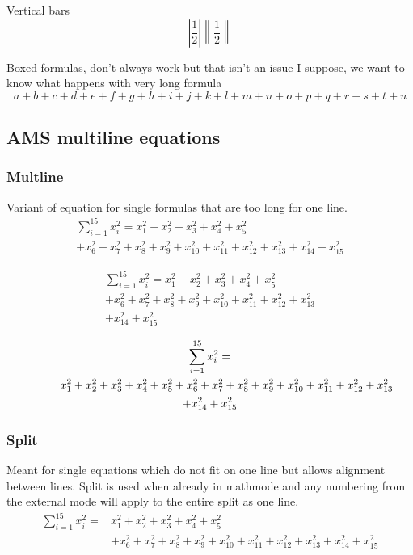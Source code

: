 \documentclass[12pt,a4paper]{article}
\theoremstyle{clearprint}
\begin{document}
\noindent
Vertical bars
\begin{equation}
\left\lvert \frac{1}{2}\right\rvert \left\lVert \frac{1}{2}\right\rVert
\end{equation}

\noindent
Boxed formulas, don't always work but that isn't an issue I suppose, we want to know what happens with very long formula
\begin{equation}
\boxed{a + b + c + d + e + f + g + h + i + j + k + l + m + n + o + p + q + r + s + t + u}
\end{equation}

\subsection[AMS multiline]{AMS multiline equations}

\subsubsection[Multline]{Multline}

Variant of equation for single formulas that are too long for one line. 
\begin{multline}
\sum_{i=1}^{15} x_i^2 = x_1^2 + x_2^2 + x_3^2 + x_4^2 + x_5^2\\
 + x_6^2 + x_7^2 + x_8^2 + x_9^2 + x_{10}^2+ x_{11}^2 + x_{12}^2 + x_{13}^2 + x_{14}^2 + x_{15}^2
\end{multline}

\begin{multline}
\sum_{i=1}^{15} x_i^2 = x_1^2 + x_2^2 + x_3^2 + x_4^2 + x_5^2\\
+ x_6^2 + x_7^2 + x_8^2 + x_9^2 + x_{10}^2+ x_{11}^2 + x_{12}^2 + x_{13}^2\\ 
+ x_{14}^2 + x_{15}^2
\end{multline}

\begin{multline}
\sum_{i=1}^{15} x_i^2 = \\
\shoveleft{\qquad x_1^2 + x_2^2 + x_3^2 + x_4^2 + x_5^2+ x_6^2 + x_7^2 + x_8^2 + x_9^2 + x_{10}^2+ x_{11}^2 + x_{12}^2 + x_{13}^2}\\ 
+ x_{14}^2 + x_{15}^2
\end{multline}


\subsubsection[Split]{Split}

Meant for single equations which do not fit on one line but allows alignment between lines. Split is used when already in mathmode and any numbering from the external mode will apply to the entire split as one line.
\begin{equation}\begin{split}
\sum_{i=1}^{15} x_i^2 =& x_1^2 + x_2^2 + x_3^2 + x_4^2 + x_5^2 \\
&+ x_6^2 + x_7^2 + x_8^2 + x_9^2 + x_{10}^2+ x_{11}^2 + x_{12}^2 + x_{13}^2 + x_{14}^2 + x_{15}^2
\end{split}\end{equation}
\end{document}

